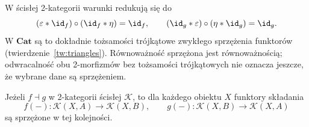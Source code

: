 W ścisłej 2-kategorii warunki redukują się do
\[
 (\varepsilon\ast\id_f)\circ(\id_f\ast\eta)=\id_f,\qquad
 (\id_g\ast\varepsilon)\circ(\eta\ast\id_g)=\id_g.
\]
W $\mathbf{Cat}$ są to dokładnie tożsamości trójkątowe zwykłego sprzężenia funktorów (twierdzenie~\ref{tw:triangles}). Równoważność sprzężona jest równoważnością; odwracalność obu 2-morfizmów bez tożsamości trójkątowych nie oznacza jeszcze, że wybrane dane są sprzężeniem.

\begin{twierdzenie}\label{cat:thm:two-hom-adjunction}
Jeżeli $f\dashv g$ w 2-kategorii ścisłej $\mathcal K$, to dla każdego obiektu $X$ funktory składania
\[
 f(-):\mathcal K(X,A)\longrightarrow\mathcal K(X,B),
 \qquad
 g(-):\mathcal K(X,B)\longrightarrow\mathcal K(X,A)
\]
są sprzężone w tej kolejności.
\end{twierdzenie}
